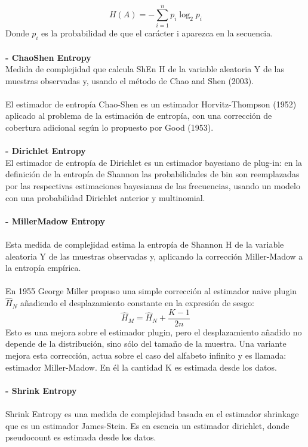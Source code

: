 \documentclass[14pt]{extarticle}
\theoremstyle{definition}
\theoremstyle{remark}
\begin{document}
\[H(A) = -\sum_{i=1}^np_{i}\log_{2}p_{i}\]
Donde $p_{i}$ es la probabilidad de que el carácter i aparezca en la secuencia.\\\\
\textbf{- ChaoShen Entropy}\citep{web:chaoshenentropy}\citep{article:entropypackage}\\
Medida de complejidad que calcula ShEn H de la variable aleatoria Y de las muestras observadas y, usando el método de Chao and Shen (2003).\\\\ El estimador de entropía Chao-Shen es un estimador Horvitz-Thompson (1952) aplicado al problema de la estimación de entropía, con una corrección de cobertura adicional según lo propuesto por Good (1953).\\\\
\textbf{- Dirichlet Entropy}\citep{web:dirichletentropy}\\
El estimador de entropía de Dirichlet es un estimador bayesiano de plug-in: en la definición de la entropía de Shannon las probabilidades de bin son reemplazadas por las respectivas estimaciones bayesianas de las frecuencias, usando un modelo con una probabilidad Dirichlet anterior y multinomial.\\\\
\textbf{- MillerMadow Entropy}\citep{web:millermadowentropy}\citep{web:millermadowentropyr}\\\\
Esta medida de complejidad estima la entropía de Shannon H de la variable aleatoria Y de las muestras observadas y, aplicando la corrección Miller-Madow a la entropía empírica.\\\\
En 1955 George Miller propuso una simple corrección al estimador naive plugin $\hat{H}_N$ añadiendo el desplazamiento constante en la expresión de sesgo:
\[\hat{H}_M=\hat{H}_N+\frac{K-1}{2n}\]
Esto es una mejora sobre el estimador plugin, pero el desplazamiento añadido no depende de la distribución, sino sólo del tamaño de la muestra. Una variante mejora esta corrección, actua sobre el caso del alfabeto infinito y es llamada: estimador Miller-Madow. En él la cantidad K es estimada desde los datos.\\\\
\textbf{- Shrink Entropy}\citep{web:shrinkentropy}\\\\
Shrink Entropy es una medida de complejidad basada en el estimador shrinkage que es un estimador James-Stein. Es en esencia un estimador dirichlet, donde pseudocount es estimada desde los datos.
\end{document}
